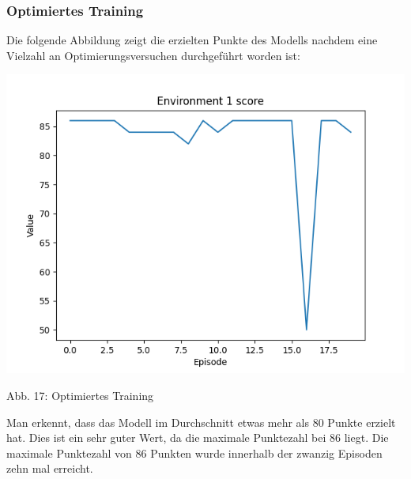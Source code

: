 \subsubsection{Optimiertes Training}
\begin{minipage}{\linewidth}
	Die folgende Abbildung zeigt die erzielten Punkte des Modells nachdem eine Vielzahl an Optimierungsversuchen durchgeführt worden ist:
	
	\vspace{0.5cm}
	\includegraphics[width=1\textwidth]{Bilder/optimizetraining}
	
	Abb. 17: Optimiertes Training\\
\end{minipage}
Man erkennt, dass das Modell im Durchschnitt etwas mehr als 80 Punkte erzielt hat. Dies ist ein sehr guter Wert, da die maximale Punktezahl bei 86 liegt. Die maximale Punktezahl von 86 Punkten wurde innerhalb der zwanzig Episoden zehn mal erreicht.
